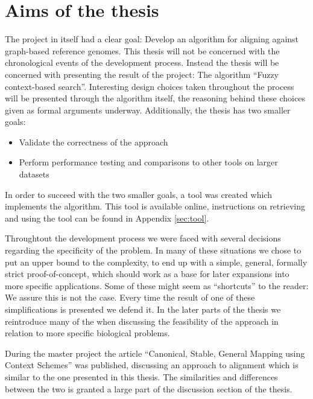 \documentclass[thesis.tex]{subfiles}
\begin{document}
\section{Aims of the thesis}
The project in itself had a clear goal: Develop an algorithm for aligning against graph-based reference genomes. This thesis will not be concerned with the chronological events of the development process. Instead the thesis will be concerned with presenting the result of the project: The algorithm ``Fuzzy context-based search''. Interesting design choices taken throughout the process will be presented through the algorithm itself, the reasoning behind these choices given as formal arguments underway. Additionally, the thesis has two smaller goals:
\begin{itemize}
  \item Validate the correctness of the approach
  \item Perform performance testing and comparisons to other tools on larger datasets
\end{itemize}
In order to succeed with the two smaller goals, a tool was created which implements the algorithm. This tool is available online, instructions on retrieving and using the tool can be found in Appendix \ref{sec:tool}.\\
\par\noindent
Throughtout the development process we were faced with several decisions regarding the specificity of the problem. In many of these situations we chose to put an upper bound to the complexity, to end up with a simple, general, formally strict proof-of-concept, which should work as a base for later expansions into more specific applications. Some of these might seem as ``shortcuts'' to the reader: We assure this is not the case. Every time the result of one of these simplifications is presented we defend it. In the later parts of the thesis we reintroduce many of the when discussing the feasibility of the approach in relation to more specific biological problems.\\
\par\noindent
During the master project the article ``Canonical, Stable, General Mapping using Context Schemes'' was published, discussing an approach to alignment which is similar to the one presented in this thesis. The similarities and differences between the two is granted a large part of the discussion section of the thesis.
\end{document}
